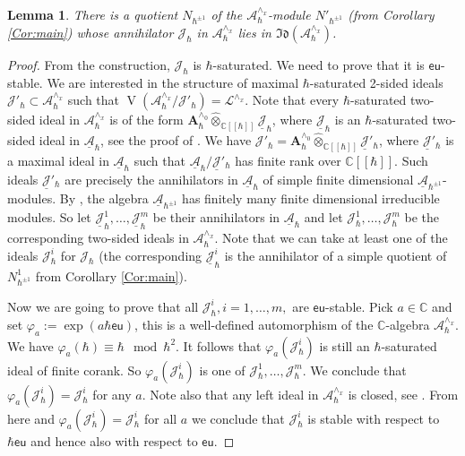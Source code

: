 \documentclass[12pt]{amsart}
\newcommand{\A}{\mathcal{A}}
\newcommand{\K}{\mathbb{C}}
\newcommand{\VA}{\operatorname{V}}
\newcommand{\Weyl}{\mathbf{A}}
\newcommand{\J}{\mathcal{J}}
\newtheorem{Lem}[Thm]{Lemma}
\theoremstyle{definition}
\begin{document}
\begin{Lem}\label{Lem:Euler_stab}
There is a quotient $N_{\hbar^{\pm 1}}$ of the $\A_\hbar^{\wedge_x}$-module
$N'_{\hbar^{\pm 1}}$ (from Corollary \ref{Cor:main})  whose annihilator
$\mathcal{J}_\hbar$ in $\A_\hbar^{\wedge_x}$ lies in $\mathfrak{Id}(\A_\hbar^{\wedge_x})$.
\end{Lem}
\begin{proof}
From the construction, $\mathcal{J}_\hbar$ is $\hbar$-saturated. We need to prove that it
is $\mathsf{eu}$-stable.   We are interested in the structure of maximal $\hbar$-saturated
2-sided ideals $\mathcal{J}'_\hbar\subset \A_\hbar^{\wedge_x}$ such that
$\VA(\A_\hbar^{\wedge_x}/\mathcal{J}'_\hbar)=\mathcal{L}^{\wedge_x}$.
Note that every $\hbar$-saturated two-sided ideal in $\A_\hbar^{\wedge_x}$ is of the form $\Weyl_\hbar^{\wedge_0}\widehat{\otimes}_{\K[[\hbar]]}\underline{\J}_\hbar$,
where $\underline{\J}_\hbar$ is an $\hbar$-saturated two-sided ideal in $\underline{\A}_\hbar$,
see the proof of \cite[Lemma 3.4.3]{Wquant}. We have $\mathcal{J}'_\hbar=\Weyl_\hbar^{\wedge_0}\widehat{\otimes}_{\K[[\hbar]]}\underline{\mathcal{J}}'_\hbar$,
where $\underline{\mathcal{J}}'_\hbar$ is a maximal ideal in $\underline{\A}_\hbar$ such that
$\underline{\A}_\hbar/\underline{\mathcal{J}}'_\hbar$ has finite rank over $\K[[\hbar]]$.
Such ideals $\underline{\mathcal{J}}'_\hbar$ are precisely the annihilators in $\underline{\A}_\hbar$ of
simple finite dimensional $\underline{\A}_{\hbar^{\pm 1}}$-modules. By \cite[Corollary 3.19]{ES},
the algebra $\underline{\A}_{\hbar^{\pm 1}}$ has finitely many finite dimensional irreducible modules.
So let $\underline{\J}^1_\hbar,\ldots, \underline{\J}^m_\hbar$ be their annihilators in
$\underline{\A}_\hbar$ and let $\J^1_\hbar,\ldots,\J^m_\hbar$ be the corresponding
two-sided ideals in $\A_\hbar^{\wedge_x}$. Note that we can take at least one of
the ideals $\J^i_\hbar$ for $\J_\hbar$ (the corresponding $\underline{\J}^i_\hbar$
is the annihilator of a simple quotient of  $N^1_{\hbar^{\pm 1}}$ from Corollary \ref{Cor:main}).

Now we are going to prove that all $\J^i_\hbar, i=1,\ldots,m,$ are $\mathsf{eu}$-stable.
Pick $a\in \K$ and set $\varphi_a:=\exp(a\hbar \mathsf{eu})$, this is a well-defined
automorphism of the $\K$-algebra $\A_\hbar^{\wedge_x}$. We have $\varphi_a(\hbar)\equiv \hbar \mod \hbar^2$.
It follows that $\varphi_a (\J^i_\hbar)$ is still an $\hbar$-saturated ideal of finite corank.
So $\varphi_a (\J^i_\hbar)$ is one of $\J^1_\hbar,\ldots,\J^m_\hbar$. We conclude that
$\varphi_a (\J^i_\hbar)=\J^i_\hbar$ for any $a$. Note also that any left ideal in $\A_\hbar^{\wedge_x}$
is closed, see \cite[Lemma 2.4.4]{HC}. From here and $\varphi_a (\J^i_\hbar)=\J^i_\hbar$ for all $a$ we
conclude that $\J^i_\hbar$ is stable with respect to $\hbar \mathsf{eu}$ and hence also with respect to $\mathsf{eu}$.
\end{proof}
\end{document}
